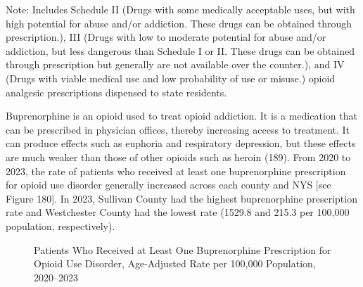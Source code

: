 \documentclass[
  english,
  letterpaper,
]{report}
\begin{document}
\begin{tcolorbox}[enhanced jigsaw, breakable, leftrule=.75mm, title=\textcolor{quarto-callout-note-color}{\faInfo}\hspace{0.5em}{Note}, bottomrule=.15mm, opacityback=0, left=2mm, colback=white, bottomtitle=1mm, coltitle=black, colbacktitle=quarto-callout-note-color!10!white, colframe=quarto-callout-note-color-frame, opacitybacktitle=0.6, toptitle=1mm, titlerule=0mm, arc=.35mm, rightrule=.15mm, toprule=.15mm]

Note: Includes Schedule II (Drugs with some medically acceptable uses,
but with high potential for abuse and/or addiction. These drugs can be
obtained through prescription.), III (Drugs with low to moderate
potential for abuse and/or addiction, but less dangerous than Schedule I
or II. These drugs can be obtained through prescription but generally
are not available over the counter.), and IV (Drugs with viable medical
use and low probability of use or misuse.) opioid analgesic
prescriptions dispensed to state residents.

\end{tcolorbox}

Buprenorphine is an opioid used to treat opioid addiction. It is a
medication that can be prescribed in physician offices, thereby
increasing access to treatment. It can produce effects such as euphoria
and respiratory depression, but these effects are much weaker than those
of other opioids such as heroin (189). From 2020 to 2023, the rate of
patients who received at least one buprenorphine prescription for opioid
use disorder generally increased across each county and NYS {[}see
Figure 180{]}. In 2023, Sullivan County had the highest buprenorphine
prescription rate and Westchester County had the lowest rate (1529.8 and
215.3 per 100,000 population, respectively).

\begin{figure}


\caption{\label{fig-at-least-1-bup-aar}Patients Who Received at Least
One Buprenorphine Prescription for Opioid Use Disorder, Age-Adjusted
Rate per 100,000 Population, 2020--2023}

\end{figure}%
\end{document}
